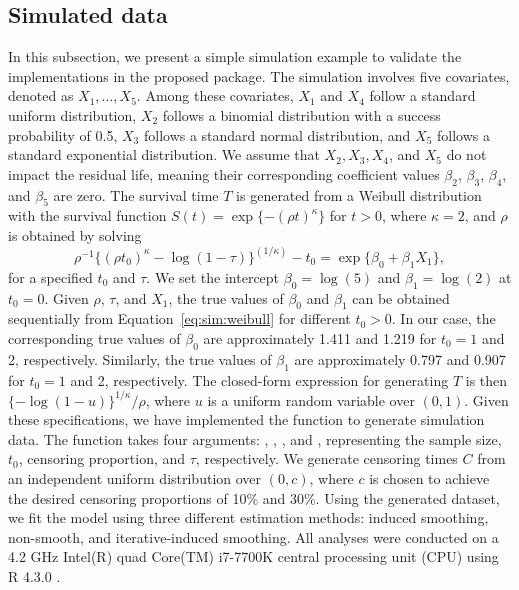 \subsection{Simulated data}\label{subsec:simulation}
In this subsection, we present a simple simulation example to validate the implementations in the 
proposed  package. 
The simulation involves five covariates, denoted as $X_1, \ldots, X_5$. 
Among these covariates, $X_1$ and $X_4$ follow a standard uniform distribution, 
$X_2$ follows a binomial distribution with a success probability of 0.5, 
$X_3$ follows a standard normal distribution, and $X_5$ follows a standard exponential distribution. 
We assume that $X_2, X_3, X_4$, and $X_5$ do not impact the residual life, 
meaning their corresponding coefficient values $\beta_2$, $\beta_3$, $\beta_4$, and $\beta_5$ are zero.
The survival time $T$ is generated from a Weibull distribution with the survival function 
$S(t) = \exp\{-(\rho t)^\kappa\}$ for $t > 0$, where $\kappa = 2$, and $\rho$ is obtained by solving
\begin{equation} \label{eq:sim:weibull}
  \rho^{-1}\{ (\rho t_0)^\kappa - \log (1-\tau) \}^{(1/\kappa)}- t_0 = \exp\{\beta_0 + \beta_1 X_1\},
\end{equation}
for a specified $t_0$ and $\tau$.
We set the intercept $\beta_0 = \log(5)$ and $\beta_1 = \log(2)$ at $t_0 = 0$.
Given $\rho$, $\tau$, and $X_1$, the true values of $\beta_0$ and $\beta_1$ 
can be obtained sequentially from Equation~\ref{eq:sim:weibull} for different $t_0 > 0$. 
In our case, the corresponding true values of $\beta_0$ are approximately 1.411 and 1.219 for $t_0=1$ and 2, respectively. 
Similarly, the true values of $\beta_1$ are approximately 0.797 and 0.907 for $t_0=1$ and 2, respectively.
The closed-form expression for generating $T$ is then $\{ -\log(1 - u) \}^{1/\kappa} / \rho$,
where $u$ is a uniform random variable over $(0, 1)$. 
Given these specifications, 
we have implemented the  function to generate simulation data.
The  function takes four arguments: 
, , , and , representing the sample size, $t_0$, censoring proportion, 
and $\tau$, respectively.
We generate censoring times $C$ from an independent uniform distribution over $(0, c)$, 
where $c$ is chosen to achieve the desired censoring proportions of 10\% and 30\%. 
Using the generated dataset, we fit the model using three different estimation methods: 
induced smoothing, non-smooth, and iterative-induced smoothing. 
All analyses were conducted on a 4.2 GHz Intel(R) quad Core(TM) i7-7700K central processing unit (CPU) using R 4.3.0 \citep{r2021}.
